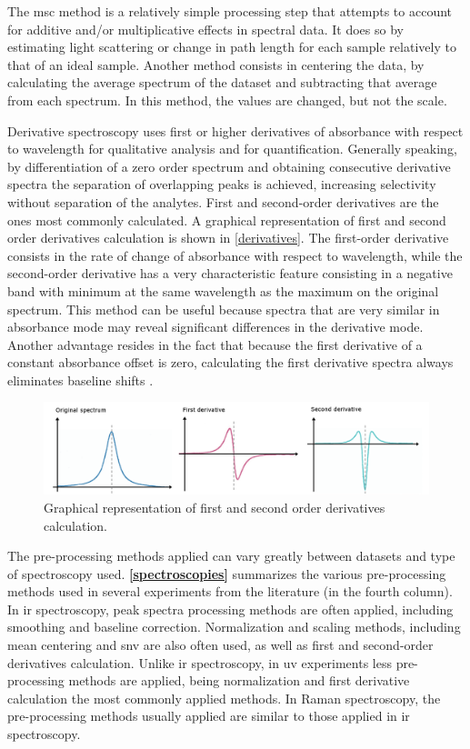 The \acrfull{msc} method is a relatively simple processing step that attempts to account for additive and/or multiplicative effects in spectral data. It does so by estimating light scattering or change in path length for each sample relatively to that of an ideal sample. Another method consists in centering the data, by calculating the average spectrum of the dataset and subtracting that average from each spectrum. In this method, the values are changed, but not the scale.

Derivative spectroscopy uses first or higher derivatives of absorbance with respect to wavelength for qualitative analysis and for quantification. Generally speaking, by differentiation of a zero order spectrum and obtaining consecutive derivative spectra the separation of overlapping peaks is achieved, increasing selectivity without separation of the analytes. First and second-order derivatives are the ones most commonly calculated. A graphical representation of first and second order derivatives calculation is shown in \autoref{derivatives}. The first-order derivative consists in the rate of change of absorbance with respect to wavelength, while the second-order derivative has a very characteristic feature consisting in a negative band with minimum at the same wavelength as the maximum on the original spectrum. This method can be useful because spectra that are very similar in absorbance mode may reveal significant differences in the derivative mode. Another advantage resides in the fact that because the first derivative of a constant absorbance offset is zero, calculating the first derivative spectra always eliminates baseline shifts \citep{kus1996derivative}.

\begin{figure}[!htb]
	\centering
	\includegraphics[width=1\linewidth]{Imagens/derivatives}
	\caption{Graphical representation of first and second order derivatives calculation.}
	\label{derivatives}
\end{figure}


The pre-processing methods applied can vary greatly between datasets and type of spectroscopy used. \textbf{\autoref{spectroscopies}} summarizes the various pre-processing methods used in several experiments from the literature (in the fourth column). In \gls{ir} spectroscopy, peak spectra processing methods are often applied, including smoothing and baseline correction. Normalization and scaling methods, including mean centering and \gls{snv} are also often used, as well as first and second-order derivatives calculation. Unlike \gls{ir} spectroscopy, in \gls{uv} experiments less pre-processing methods are applied, being normalization and first derivative calculation the most commonly applied methods. In Raman spectroscopy, the pre-processing methods usually applied are similar to those applied in \gls{ir} spectroscopy.





